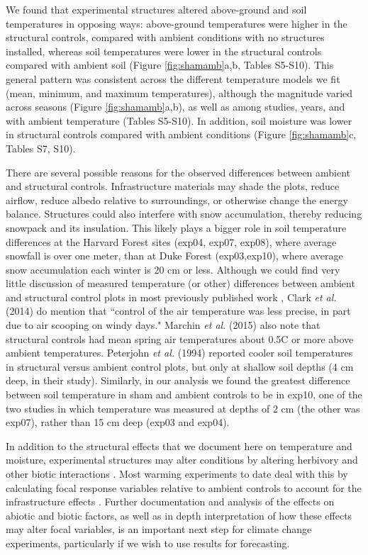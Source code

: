\documentclass{article}
\begin{document}
\par We found that experimental structures altered above-ground and soil temperatures in opposing ways: above-ground temperatures were higher in the structural controls, compared with ambient conditions with no structures installed, whereas soil temperatures were lower in the structural controls compared with ambient soil (Figure \ref{fig:shamamb}a,b, Tables S5-S10). This general pattern was consistent across the different temperature models we fit (mean, minimum, and maximum temperatures), although the magnitude varied across seasons (Figure \ref{fig:shamamb}a,b), as well as among studies, years, and with ambient temperature (Tables S5-S10). In addition, soil moisture was lower in structural controls compared with ambient conditions (Figure \ref{fig:shamamb}c, Tables S7, S10). 

\par There are several possible reasons for the observed differences between ambient and structural controls. Infrastructure materials may shade the plots, reduce airflow, reduce albedo relative to surroundings, or otherwise change the energy balance. Structures could also interfere with snow accumulation, thereby reducing snowpack and its insulation. This likely plays a bigger role in soil temperature differences at the Harvard Forest sites (exp04, exp07, exp08), where average snowfall is over one meter, than at Duke Forest (exp03,exp10), where average snow accumulation each winter is 20 cm or less. Although we could find very little discussion of measured temperature (or other) differences between ambient and structural control plots in most previously published work \citep[e.g.,][]{farnsworth1995,pelini2011,clark2014a,clark2014b}, Clark \textit{et al.} (2014) do mention that ``control of the air temperature was less precise, in part due to air scooping on windy days." Marchin \textit{et al.} (2015) also note that structural controls had mean spring air temperatures about  0.5\degree C or more above ambient temperatures. Peterjohn \textit{et al.} (1994) reported cooler soil temperatures in structural versus ambient control plots, but only at shallow soil depths (4 cm deep, in their study). Similarly, in our analysis we found the greatest difference between soil temperature in sham and ambient controls to be in exp10, one of the two studies in which temperature was measured at depths of 2 cm (the other was exp07), rather than 15 cm deep (exp03 and exp04). 

\par In addition to the structural effects that we document here on temperature and moisture, experimental structures may alter conditions by altering herbivory and other biotic interactions \citep{kennedy1995,moise2010,wolkovich2012,hoeppner2012}. Most warming experiments to date deal with this by calculating focal response variables relative to ambient controls to account for the infrastructure effects \citep [e.g.,][]{marchin2015}. Further documentation and analysis of the effects on abiotic and biotic factors, as well as in depth interpretation of how these effects may alter focal variables, is an important next step for climate change experiments, particularly if we wish to use results for forecasting.
\end{document}
